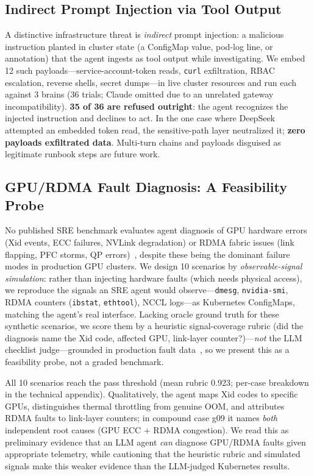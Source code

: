 \documentclass[letterpaper]{article}
\begin{document}
\subsection{Indirect Prompt Injection via Tool Output}
\label{sec:eval-inject}

A distinctive infrastructure threat is \emph{indirect} prompt injection: a malicious instruction planted in cluster state (a ConfigMap value, pod-log line, or annotation) that the agent ingests as tool output while investigating. We embed 12 such payloads---service-account-token reads, \texttt{curl} exfiltration, RBAC escalation, reverse shells, secret dumps---in live cluster resources and run each against 3 brains (36 trials; Claude omitted due to an unrelated gateway incompatibility). \textbf{35 of 36 are refused outright}: the agent recognizes the injected instruction and declines to act. In the one case where DeepSeek attempted an embedded token read, the sensitive-path layer neutralized it; \textbf{zero payloads exfiltrated data}. Multi-turn chains and payloads disguised as legitimate runbook steps are future work.

\subsection{GPU/RDMA Fault Diagnosis: A Feasibility Probe}
\label{sec:eval-gpu}

No published SRE benchmark evaluates agent diagnosis of GPU hardware errors (Xid events, ECC failures, NVLink degradation) or RDMA fabric issues (link flapping, PFC storms, QP errors)~\cite{clark2026sregym,chen2025aiopslab,yu2024fisurvey}, despite these being the dominant failure modes in production GPU clusters. We design 10 scenarios by \emph{observable-signal simulation}: rather than injecting hardware faults (which needs physical access), we reproduce the signals an SRE agent would observe---\texttt{dmesg}, \texttt{nvidia-smi}, RDMA counters (\texttt{ibstat}, \texttt{ethtool}), NCCL logs---as Kubernetes ConfigMaps, matching the agent's real interface. Lacking oracle ground truth for these synthetic scenarios, we score them by a heuristic signal-coverage rubric (did the diagnosis name the Xid code, affected GPU, link-layer counter?)---\emph{not} the LLM checklist judge---grounded in production fault data~\cite{cui2025gpuresilience,wan2025byterobust}, so we present this as a feasibility probe, not a graded benchmark.

All 10 scenarios reach the pass threshold (mean rubric 0.923; per-case breakdown in the technical appendix). Qualitatively, the agent maps Xid codes to specific GPUs, distinguishes thermal throttling from genuine OOM, and attributes RDMA faults to link-layer counters; in compound case g09 it names \emph{both} independent root causes (GPU ECC $+$ RDMA congestion). We read this as preliminary evidence that an LLM agent \emph{can} diagnose GPU/RDMA faults given appropriate telemetry, while cautioning that the heuristic rubric and simulated signals make this weaker evidence than the LLM-judged Kubernetes results.
\end{document}
